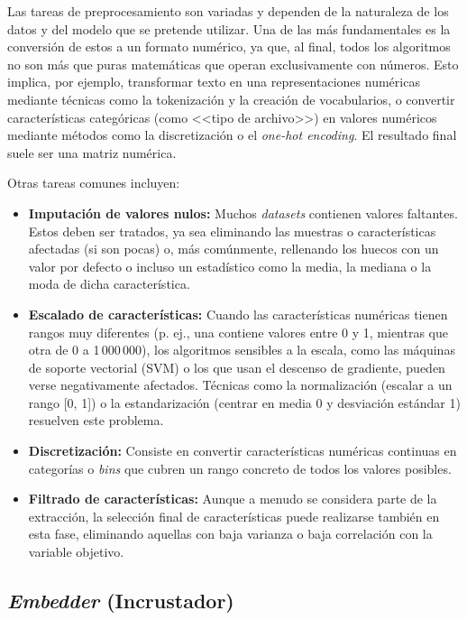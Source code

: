 Las tareas de preprocesamiento son variadas y dependen de la naturaleza de los datos y del modelo que se pretende utilizar. Una de las más fundamentales es la conversión de estos a un formato numérico, ya que, al final, todos los algoritmos no son más que puras matemáticas que operan exclusivamente con números. Esto implica, por ejemplo, transformar texto en una representaciones numéricas mediante técnicas como la tokenización y la creación de vocabularios, o convertir características categóricas (como <<tipo de archivo>>) en valores numéricos mediante métodos como la discretización o el \textit{one-hot encoding}. El resultado final suele ser una matriz numérica.~\cite{luengo2020big}

Otras tareas comunes incluyen:

\begin{itemize}
	\item \textbf{Imputación de valores nulos:} Muchos \textit{datasets} contienen valores faltantes. Estos deben ser tratados, ya sea eliminando las muestras o características afectadas (si son pocas) o, más comúnmente, rellenando los huecos con un valor por defecto o incluso un estadístico como la media, la mediana o la moda de dicha característica.
	
	\item \textbf{Escalado de características:} Cuando las características numéricas tienen rangos muy diferentes (p. ej., una contiene valores entre 0 y 1, mientras que otra de 0 a 1\,000\,000), los algoritmos sensibles a la escala, como las máquinas de soporte vectorial (SVM) o los que usan el descenso de gradiente, pueden verse negativamente afectados. Técnicas como la normalización (escalar a un rango [0, 1]) o la estandarización (centrar en media 0 y desviación estándar 1) resuelven este problema.
	
	\item \textbf{Discretización:} Consiste en convertir características numéricas continuas en categorías o \textit{bins} que cubren un rango concreto de todos los valores posibles.
	
	\item \textbf{Filtrado de características:} Aunque a menudo se considera parte de la extracción, la selección final de características puede realizarse también en esta fase, eliminando aquellas con baja varianza o baja correlación con la variable objetivo.
\end{itemize}

\subsection{\textit{Embedder} (Incrustador)}

